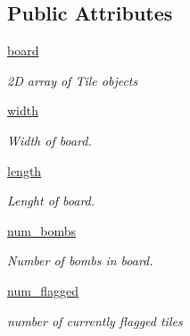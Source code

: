 \subsection*{Public Attributes}
\begin{DoxyCompactItemize}
\item 
\mbox{\label{classboard_1_1_board_aece806dcfd4c75f3cc8c0f5c8fd5c544}} 
\mbox{\hyperlink{classboard_1_1_board_aece806dcfd4c75f3cc8c0f5c8fd5c544}{board}}
\begin{DoxyCompactList}\small\item\em 2D array of Tile objects \end{DoxyCompactList}\item 
\mbox{\label{classboard_1_1_board_a96e3212b056035d81c4081b01be6eada}} 
\mbox{\hyperlink{classboard_1_1_board_a96e3212b056035d81c4081b01be6eada}{width}}
\begin{DoxyCompactList}\small\item\em Width of board. \end{DoxyCompactList}\item 
\mbox{\label{classboard_1_1_board_a3d1542390da10fc0a0ad7b7c10743ec2}} 
\mbox{\hyperlink{classboard_1_1_board_a3d1542390da10fc0a0ad7b7c10743ec2}{length}}
\begin{DoxyCompactList}\small\item\em Lenght of board. \end{DoxyCompactList}\item 
\mbox{\label{classboard_1_1_board_a02ab9ac6c1ca1cc4d90de80a41238671}} 
\mbox{\hyperlink{classboard_1_1_board_a02ab9ac6c1ca1cc4d90de80a41238671}{num\+\_\+bombs}}
\begin{DoxyCompactList}\small\item\em Number of bombs in board. \end{DoxyCompactList}\item 
\mbox{\label{classboard_1_1_board_a06330638cbfa0ae779bb1a149ad26bc4}} 
\mbox{\hyperlink{classboard_1_1_board_a06330638cbfa0ae779bb1a149ad26bc4}{num\+\_\+flagged}}
\begin{DoxyCompactList}\small\item\em number of currently flagged tiles \end{DoxyCompactList}\end{DoxyCompactItemize}


